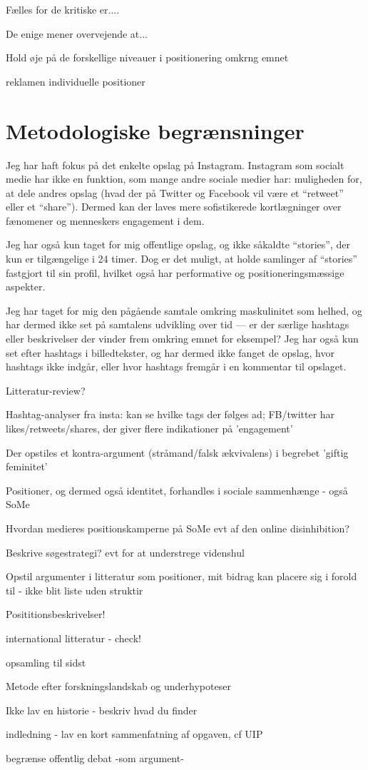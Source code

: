 Fælles for de kritiske er....

De enige mener overvejende at...

Hold øje på de forskellige niveauer i positionering omkrng emnet

reklamen
individuelle positioner

\section{Metodologiske begrænsninger}
Jeg har haft fokus på det enkelte opslag på Instagram. Instagram 
som socialt medie har ikke en funktion, som mange andre sociale 
medier har: muligheden for, at dele andres opslag (hvad der på 
Twitter og Facebook vil være et “retweet” eller et “share”).  
Dermed kan der laves mere sofistikerede kortlægninger over 
fænomener og menneskers engagement i dem.

Jeg har også kun taget for mig offentlige opslag, og ikke såkaldte 
“stories”, der kun er tilgængelige i 24 timer. Dog er det muligt, 
at holde samlinger af “stories” fastgjort til sin profil, hvilket 
også har performative og positioneringsmæssige aspekter.

Jeg har taget for mig den pågående samtale omkring maskulinitet 
som helhed, og har dermed ikke set på samtalens udvikling over tid 
— er der særlige hashtags eller beskrivelser der vinder frem 
omkring emnet for eksempel? Jeg har også kun set efter hashtags i 
billedtekster, og har dermed ikke fanget de opslag, hvor hashtags 
ikke indgår, eller hvor hashtags fremgår i en kommentar til 
opslaget.


Litteratur-review?

Hashtag-analyser fra insta: kan se hvilke tags der følges ad;
FB/twitter har likes/retweets/shares, der giver flere indikationer
på 'engagement'

Der opstiles et kontra-argument (stråmand/falsk ækvivalens) i
begrebet 'giftig feminitet'

Positioner, og dermed også identitet, forhandles i sociale
sammenhænge - også SoMe 

Hvordan medieres positionskamperne på SoMe evt af den online
disinhibition?

Beskrive søgestrategi? evt for at understrege videnshul

Opstil argumenter i litteratur som positioner, mit bidrag kan
placere sig i forold til - ikke blit liste uden struktir

Posititionsbeskrivelser!

international litteratur - check! 

opsamling til sidst

Metode efter forskningslandskab og underhypoteser

Ikke lav en historie - beskriv hvad du finder

indledning - lav en kort sammenfatning af opgaven, cf UIP

begrænse offentlig debat -som argument-
